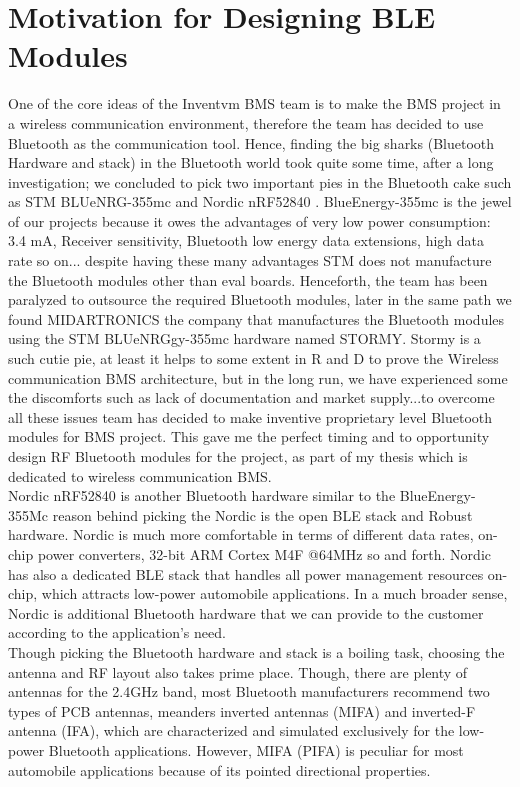 \section{Motivation for Designing BLE Modules }
One of the core ideas of the Inventvm BMS team is to make the BMS project in a wireless communication environment, therefore the team has decided to use Bluetooth as the communication tool. Hence, finding the big sharks (Bluetooth Hardware and stack) in the Bluetooth world took quite some time, after a long investigation; we concluded to pick two important pies in the Bluetooth cake such as STM BLUeNRG-355mc \cite{BLNRG355_STEVAL_GUIDE} and Nordic nRF52840 \cite{NORDIC_nrf52840_USERGUIDE}. BlueEnergy-355mc is the jewel of our projects because it owes the advantages of very low power consumption: 3.4 mA, Receiver sensitivity, Bluetooth low energy data extensions, high data rate so on... despite having these many advantages STM does not manufacture the Bluetooth modules other than eval boards. Henceforth, the team has been paralyzed to outsource the required Bluetooth modules, later in the same path we found MIDARTRONICS the company that manufactures the Bluetooth modules using the STM BLUeNRGgy-355mc hardware named STORMY. Stormy is a such cutie pie, at least it helps to some extent in R and D to prove the Wireless communication BMS architecture, but in the long run, we have experienced some the discomforts such as lack of documentation and market supply...to overcome all these issues team has decided to make inventive proprietary level Bluetooth modules for BMS project. This gave me the perfect timing and to opportunity design RF Bluetooth modules for the project, as part of my thesis which is dedicated to wireless communication BMS.\\
\indent Nordic nRF52840\cite{NORDIC_nrf52840_USERGUIDE} is another Bluetooth hardware similar to the BlueEnergy-355Mc reason behind picking the Nordic is the open BLE stack and Robust hardware. Nordic is much more comfortable in terms of different data rates, on-chip power converters, 32-bit ARM Cortex M4F @64MHz so and forth. Nordic has also a dedicated BLE stack \cite{NORDIC_nrf52840_SOFTWARESTACK_GUIDE} that handles all power management resources on-chip, which attracts low-power automobile applications. In a much broader sense, Nordic is additional Bluetooth hardware that we can provide to the customer according to the application's need.\\
\indent Though picking the Bluetooth hardware and stack is a boiling task, choosing the antenna and RF layout also takes prime place. Though, there are plenty of antennas for the 2.4GHz band, most Bluetooth manufacturers recommend two types of PCB antennas, meanders inverted antennas (MIFA) and inverted-F antenna (IFA), which are characterized and simulated exclusively for the low-power Bluetooth applications. However, MIFA (PIFA) is peculiar for most automobile applications because of its pointed directional properties.\\
